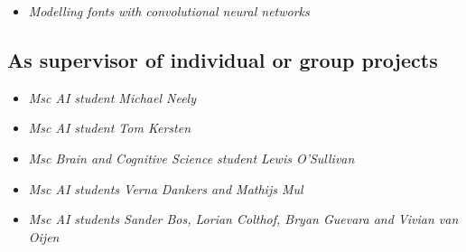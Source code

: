 {{{{{{{{{
{\begin{itemize}
  \item[] \textit{Modelling fonts with convolutional neural networks}
\end{itemize}}}

\vspace{1mm}

\subsection{As supervisor of individual or group projects}

{
{\begin{itemize}
  \item[] \textit{Msc AI student Michael Neely}
\end{itemize}}}

{
{\begin{itemize}
  \item[] \textit{Msc AI student Tom Kersten}
\end{itemize}}}


{
{\begin{itemize}
  \item[] \textit{Msc Brain and Cognitive Science student Lewis O'Sullivan}
\end{itemize}}}

{
{\begin{itemize}
  \item[] \textit{Msc AI students Verna Dankers and Mathijs Mul}
\end{itemize}}}

{
{\begin{itemize}
  \item[] \textit{Msc AI students Sander Bos, Lorian Colthof, Bryan Guevara and Vivian van Oijen}
\end{itemize}}}

}}}}}}}}
